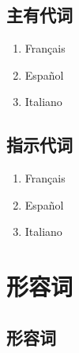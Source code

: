 \documentclass[UTF8,a4paper,titlepage,10pt]{report}
\begin{document}
\section{主有代词}
\label{sec:orgcbb386f}

\begin{enumerate}
\item Français
\label{sec:orgd5c4543}

\item Español
\label{sec:org83385bf}

\item Italiano
\label{sec:orgaefba70}
\end{enumerate}

\section{指示代词}
\label{sec:orga3266d9}

\begin{enumerate}
\item Français
\label{sec:org3ccb146}

\item Español
\label{sec:org138098a}

\item Italiano
\label{sec:orgbe08766}
\end{enumerate}

\chapter{形容词}
\label{sec:orgcc0cb44}

\section{形容词}
\label{sec:org81e8fe0}
\end{document}
